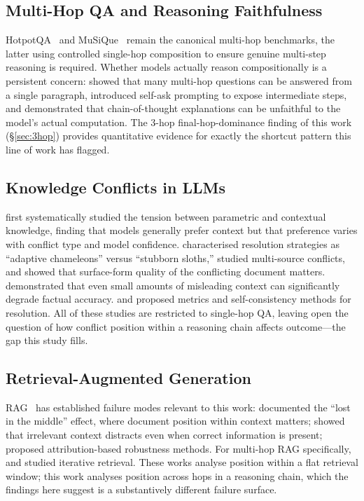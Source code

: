 \subsection{Multi-Hop QA and Reasoning Faithfulness}

HotpotQA~\citep{yang2018hotpotqa} and MuSiQue~\citep{trivedi2022musique} remain the canonical multi-hop benchmarks, the latter using controlled single-hop composition to ensure genuine multi-step reasoning is required. Whether models actually reason compositionally is a persistent concern: \citet{min2019compositional} showed that many multi-hop questions can be answered from a single paragraph, \citet{press2023measuring} introduced self-ask prompting to expose intermediate steps, and \citet{turpin2023language} demonstrated that chain-of-thought explanations can be unfaithful to the model's actual computation. The 3-hop final-hop-dominance finding of this work (\S\ref{sec:3hop}) provides quantitative evidence for exactly the shortcut pattern this line of work has flagged.

\subsection{Knowledge Conflicts in LLMs}

\citet{longpre2021entity} first systematically studied the tension between parametric and contextual knowledge, finding that models generally prefer context but that preference varies with conflict type and model confidence. \citet{xie2024adaptive} characterised resolution strategies as ``adaptive chameleons'' versus ``stubborn sloths,'' \citet{chen2022rich} studied multi-source conflicts, and \citet{li2023large} showed that surface-form quality of the conflicting document matters. \citet{pan2023risk} demonstrated that even small amounts of misleading context can significantly degrade factual accuracy. \citet{neeman2023disentqa} and \citet{wang2023resolving} proposed metrics and self-consistency methods for resolution. All of these studies are restricted to single-hop QA, leaving open the question of how conflict position within a reasoning chain affects outcome---the gap this study fills.

\subsection{Retrieval-Augmented Generation}

RAG~\citep{lewis2020retrieval,guu2020realm} has established failure modes relevant to this work: \citet{liu2024lost} documented the ``lost in the middle'' effect, where document position within context matters; \citet{shi2023large} showed that irrelevant context distracts even when correct information is present; \citet{yoran2024making} proposed attribution-based robustness methods. For multi-hop RAG specifically, \citet{khattab2021baleen} and \citet{trivedi2023interleaving} studied iterative retrieval. These works analyse position within a flat retrieval window; this work analyses position across hops in a reasoning chain, which the findings here suggest is a substantively different failure surface.


